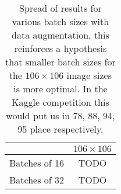 \begin{table}[]
    \centering
    \begin{tabular}{|r|c||}
        \hline
                      & $106 \times 106$ \\ \hline
        Batches of 16 &  TODO \\ \hline
        Batches of 32 &  TODO \\ \hline
    \end{tabular}
    \caption{Spread of results for various batch sizes with data augmentation, this reinforces a hypothesis that smaller batch sizes for the $106 \times 106$ image sizes is more optimal. In the Kaggle competition this would put us in 78, 88, 94, 95 place respectively.}
    \label{tab:results2}
\end{table}